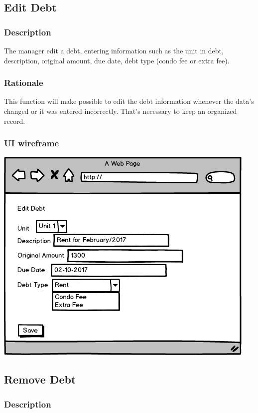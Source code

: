 \documentclass{scrreprt}
\begin{document}
\subsection{Edit Debt}
\subsubsection{Description}

The manager edit a debt, entering information such as the unit in debt, description, original amount, due date, debt type (condo fee or extra fee).

\subsubsection{Rationale}

This function will make possible to edit the debt information whenever the data's changed or it was entered incorrectly. That's necessary to keep an organized record.

\subsubsection{UI wireframe}
\includegraphics[scale=0.60]{mockups/editdebt.png}

\subsection{Remove Debt}
\subsubsection{Description}
\end{document}
